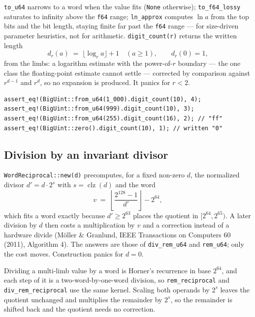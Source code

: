 \documentclass[11pt]{article}
\newcommand{\code}[1]{\texttt{#1}}
\begin{document}
\code{to\_u64} narrows to a word when the value fits (\code{None}
otherwise); \code{to\_f64\_lossy} saturates to infinity above the
\code{f64} range; \code{ln\_approx} computes $\ln a$ from the top bits and
the bit length, staying finite far past the \code{f64} range --- for
size-driven parameter heuristics, not for arithmetic.
\code{digit\_count(r)} returns the written length
\begin{equation}
d_r(a) \;=\; \lfloor \log_r a \rfloor + 1 \quad (a \ge 1),
\qquad d_r(0) = 1,
\end{equation}
from the limbs: a logarithm estimate with the power-of-$r$ boundary ---
the one class the floating-point estimate cannot settle --- corrected by
comparison against $r^{d-1}$ and $r^d$, so no expansion is produced. It
panics for $r < 2$.

\begin{lstlisting}
assert_eq!(BigUint::from_u64(1_000).digit_count(10), 4);
assert_eq!(BigUint::from_u64(999).digit_count(10), 3);
assert_eq!(BigUint::from_u64(255).digit_count(16), 2); // "ff"
assert_eq!(BigUint::zero().digit_count(10), 1); // written "0"
\end{lstlisting}

\subsection{Division by an invariant divisor}

\code{WordReciprocal::new(d)} precomputes, for a fixed non-zero $d$, the
normalized divisor $d' = d \cdot 2^{s}$ with $s = \operatorname{clz}(d)$ and
the word
\begin{equation}
v \;=\; \left\lfloor \frac{2^{128} - 1}{d'} \right\rfloor - 2^{64},
\end{equation}
which fits a word exactly because $d' \ge 2^{63}$ places the quotient in
$[2^{64}, 2^{65})$. A later division by $d$ then costs a multiplication by
$v$ and a correction instead of a hardware divide (Möller \& Granlund, IEEE
Transactions on Computers 60 (2011), Algorithm 4). The answers are those of
\code{div\_rem\_u64} and \code{rem\_u64}; only the cost moves. Construction
panics for $d = 0$.

Dividing a multi-limb value by a word is Horner's recurrence in base
$2^{64}$, and each step of it is a two-word-by-one-word division, so
\code{rem\_reciprocal} and \code{div\_rem\_reciprocal} use the same kernel.
Scaling both operands by $2^{s}$ leaves the quotient unchanged and
multiplies the remainder by $2^{s}$, so the remainder is shifted back and
the quotient needs no correction.
\end{document}
